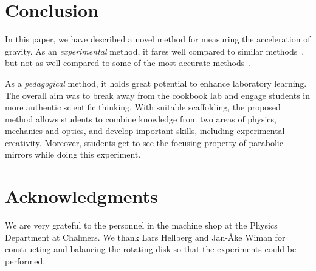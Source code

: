 \documentclass[12pt, a4paper, twocolumn]{article}
\begin{document}
\section{Conclusion}

In this paper, we have described a novel method for measuring the acceleration of gravity. As an \emph{experimental} method, it fares well compared to similar methods~\cite{IPhO2001}, but not as well compared to some of the most accurate methods~\cite{Candela2001}. 

As a \emph{pedagogical} method, it holds great potential to enhance laboratory learning. The overall aim was to break away from the cookbook lab and engage students in more authentic scientific thinking. With suitable scaffolding, the proposed method allows students to combine knowledge from two areas of physics, mechanics and optics, and develop important skills, including experimental creativity. Moreover, students get to see the focusing property of parabolic mirrors while doing this experiment.

\section*{Acknowledgments}

We are very grateful to the personnel in the machine shop at the
Physics Department at Chalmers. We thank Lars Hellberg and Jan-Åke
Wiman for constructing and balancing the rotating disk so that the
experiments could be performed. 



\end{document}
